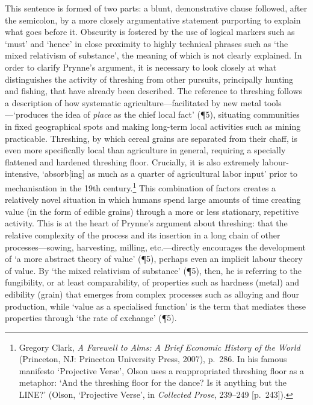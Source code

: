 \documentclass[]{article}
\begin{document}
This sentence is formed of two parts: a blunt, demonstrative clause
followed, after the semicolon, by a more closely argumentative statement
purporting to explain what goes before it. Obscurity is fostered by the
use of logical markers such as `must' and `hence' in close proximity to
highly technical phrases such as `the mixed relativism of substance',
the meaning of which is not clearly explained. In order to clarify
Prynne's argument, it is necessary to look closely at what distinguishes
the activity of threshing from other pursuits, principally hunting and
fishing, that have already been described. The reference to threshing
follows a description of how systematic agriculture---facilitated by new
metal tools---`produces the idea of \emph{place} as the chief local
fact' (¶5), situating communities in fixed geographical spots and making
long-term local activities such as mining practicable. Threshing, by
which cereal grains are separated from their chaff, is even more
specifically local than agriculture in general, requiring a specially
flattened and hardened threshing floor. Crucially, it is also extremely
labour-intensive, `absorb{[}ing{]} as much as a quarter of agricultural
labor input' prior to mechanisation in the 19th century.\footnote{Gregory
  Clark, \emph{A Farewell to Alms: A Brief Economic History of the
  World} (Princeton, NJ: Princeton University Press, 2007), p.~286. In
  his famous manifesto `Projective Verse', Olson uses a reappropriated
  threshing floor as a metaphor: `And the threshing floor for the dance?
  Is it anything but the LINE?' (Olson, `Projective Verse', in
  \emph{Collected Prose}, 239--249 {[}p.~243{]}).} This combination of
factors creates a relatively novel situation in which humans spend large
amounts of time creating value (in the form of edible grains) through a
more or less stationary, repetitive activity. This is at the heart of
Prynne's argument about threshing: that the relative complexity of the
process and its insertion in a long chain of other processes---sowing,
harvesting, milling, etc.---directly encourages the development of `a
more abstract theory of value' (¶5), perhaps even an implicit labour
theory of value. By `the mixed relativism of substance' (¶5), then, he
is referring to the fungibility, or at least comparability, of
properties such as hardness (metal) and edibility (grain) that emerges
from complex processes such as alloying and flour production, while
`value as a specialised function' is the term that mediates these
properties through `the rate of exchange' (¶5).
\end{document}
